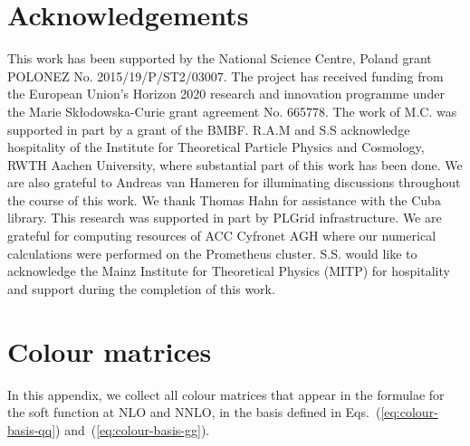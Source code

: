 \documentclass[a4paper,11pt]{article}
\numberwithin{equation}{section}
\begin{document}
\label{sec:summary}

\section*{Acknowledgements}

This work has been supported by the National Science Centre, Poland grant
POLONEZ  
%
No. 2015/19/P/ST2/03007. 
%
The project has received funding from the
European Union's Horizon 2020 research  and  innovation  programme  under  the
Marie Sk\l{}odowska-Curie grant agreement No. 665778.
%
The work of M.C. was supported in part by a grant of the BMBF.
%
R.A.M and S.S acknowledge hospitality of the
Institute for Theoretical Particle Physics and Cosmology, RWTH Aachen
University, where substantial part of this work has been done.
%
We are also grateful to Andreas van Hameren for illuminating discussions
throughout the course of this work.
%
We thank Thomas Hahn for assistance with the Cuba library.
%
This research was supported in part by PLGrid infrastructure.
%
We are grateful for computing resources of ACC Cyfronet AGH where our numerical
calculations were performed on the Prometheus cluster.
%
S.S. would like to acknowledge the Mainz Institute for Theoretical Physics
(MITP) for hospitality and support during the completion of this work.

\appendix


%
%
\section{Colour matrices}
\label{app:colmat}

In this appendix, we collect all colour matrices that appear in the formulae
for the soft function at NLO and NNLO, in the basis defined in 
Eqs.~(\ref{eq:colour-basis-qq}) and~(\ref{eq:colour-basis-gg}).
\end{document}
